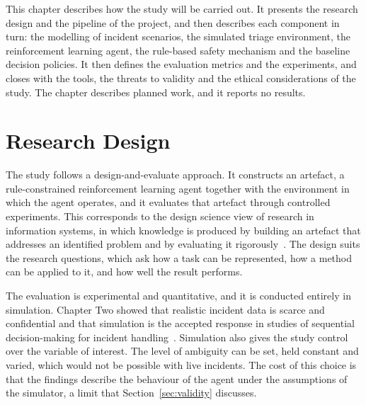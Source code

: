 

This chapter describes how the study will be carried out. It presents the research design and the pipeline of the project, and then describes each component in turn: the modelling of incident scenarios, the simulated triage environment, the reinforcement learning agent, the rule-based safety mechanism and the baseline decision policies. It then defines the evaluation metrics and the experiments, and closes with the tools, the threats to validity and the ethical considerations of the study. The chapter describes planned work, and it reports no results.

\section{Research Design}

The study follows a design-and-evaluate approach. It constructs an artefact, a rule-constrained reinforcement learning agent together with the environment in which the agent operates, and it evaluates that artefact through controlled experiments. This corresponds to the design science view of research in information systems, in which knowledge is produced by building an artefact that addresses an identified problem and by evaluating it rigorously~\cite{hevner2004}. The design suits the research questions, which ask how a task can be represented, how a method can be applied to it, and how well the result performs.

The evaluation is experimental and quantitative, and it is conducted entirely in simulation. Chapter Two showed that realistic incident data is scarce and confidential and that simulation is the accepted response in studies of sequential decision-making for incident handling~\cite{remil2024,hammar2025,dunsin2025}. Simulation also gives the study control over the variable of interest. The level of ambiguity can be set, held constant and varied, which would not be possible with live incidents. The cost of this choice is that the findings describe the behaviour of the agent under the assumptions of the simulator, a limit that Section~\ref{sec:validity} discusses.

